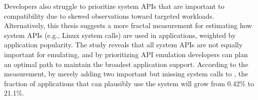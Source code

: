 Developers also struggle to prioritize system APIs that are important to compatibility
due to skewed observations toward
targeted workloads.
Alternatively,
this thesis suggests a more fractal measurement
for estimating how system APIs
(e.g., Linux system calls)
are used in applications,
weighted by application popularity.
The study reveals that all system APIs are not equally important for emulating,
and by prioritizing API emulation
developers can plan an optimal path to maintain the broadest application support.
According to the measurement,
by merely adding two important but missing system calls to \graphene{},
the fraction of applications that can plausibly use the system
will grow from 0.42\% to 21.1\%.



